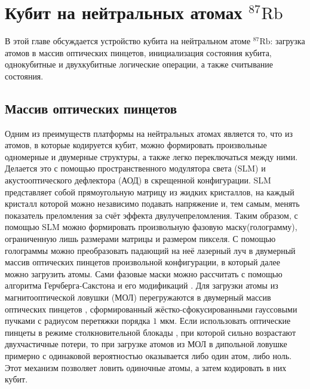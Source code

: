 \section{Кубит на нейтральных атомах $^{87}\text{Rb}$}
\label{sec:chapter_2}

В этой главе обсуждается устройство кубита на нейтральном атоме $^{87}\text{Rb}$: загрузка атомов в массив оптических пинцетов, инициализация состояния кубита, однокубитные и двухкубитные логические операции, а также считывание состояния.


\subsection{Массив оптических пинцетов}

Одним из преимуществ платформы на нейтральных атомах является то, что из атомов, в которые кодируется кубит, можно формировать произвольные одномерные и двумерные структуры, а также легко переключаться между ними. Делается это с помощью пространственного модулятора света (SLM) и акустооптического дефлектора (АОД) в скрещенной конфигурации. SLM представляет собой прямоугольную матрицу из жидких кристаллов, на каждый кристалл которой можно независимо подавать напряжение и, тем самым, менять показатель преломления за счёт эффекта двулучепреломления. Таким образом, с помощью SLM можно формировать произвольную фазовую маску(голограмму), ограниченную лишь размерами матрицы и размером пикселя. С помощью голограммы можно преобразовать падающий на неё лазерный луч в двумерный массив оптических пинцетов произвольной конфигурации, в который далее можно загрузить атомы. Сами фазовые маски можно рассчитать с помощью алгоритма Герчберга-Сакстона \cite{Gerchberg1972APA} и его модификаций \cite{robust_masks,Zupancic:16}. Для загрузки атомы из магнитооптической ловушки (МОЛ) перегружаются в двумерный массив оптических пинцетов \cite{Ashkin:99}, сформированный жёстко-сфокусированными гауссовыми пучками с радиусом перетяжки порядка $1 \text{ мкм}$. Если использовать оптические пинцеты в режиме столкновительной блокады \cite{Schlosser_Grangier,Kuppens_Wieman}, при которой сильно возрастают двухчастичные потери, то при загрузке атомов из МОЛ в дипольной ловушке примерно с одинаковой вероятностью оказывается либо один атом, либо ноль. Этот механизм позволяет ловить одиночные атомы, а затем кодировать в них кубит. 

